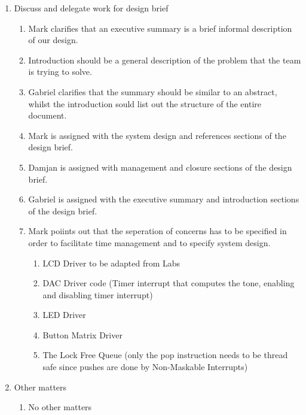 \documentclass[11pt,a4paper]{scrartcl}
\begin{document}
\begin{enumerate}
\item Discuss and delegate work for design brief
    \begin{enumerate}
        \item Mark clarifies that an executive summary is a brief informal description of our design.
        \item Introduction should be a general description of the problem that the team is trying to solve.
        \item Gabriel clarifies that the summary should be similar to an abstract, whilst the introduction sould list out the structure of the entire document.
        \item Mark is assigned with the system design and references sections of the design brief.
        \item Damjan is assigned with management and closure sections of the design brief.
        \item Gabriel is assigned with the executive summary and introduction sections of the design brief.
        \item Mark poiints out that the seperation of concerns has to be specified in order to facilitate time management and to specify system design.
        \begin{enumerate}
            \subsection{Modules}
            \item LCD Driver to be adapted from Labs
            \item DAC Driver code (Timer interrupt that computes the tone, enabling and disabling timer interrupt)
            \item LED Driver
            \item Button Matrix Driver
            \item The Lock Free Queue (only the pop instruction needs to be thread safe since pushes are done by Non-Maskable Interrupts)
        \end{enumerate}
    \end{enumerate}

\item Other matters
    \begin{enumerate}
        \item No other matters
    \end{enumerate}


\end{enumerate}
\end{document}
